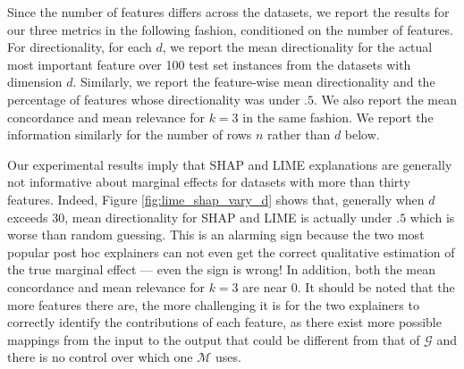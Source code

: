 \documentclass[mnsc,blindrev]{informs3}
\newcommand{\mG}{\mathcal{G}}
\newcommand{\mM}{\mathcal{M}}
\begin{document}
        Since the number of features differs across the datasets, we report the results for our three metrics in the following fashion, conditioned on the number of features. For directionality, for each $d$, we report the mean directionality for the actual most important feature over 100 test set instances from the datasets with dimension $d$. Similarly, we report the feature-wise mean directionality and the percentage of features whose directionality was under $.5$. We also report the mean concordance and mean relevance for $k=3$ in the same fashion. We report the information similarly for the number of rows $n$ rather than $d$ below.   

    
    Our experimental results imply that SHAP and LIME explanations are generally not informative about marginal effects for datasets with more than thirty features. Indeed, Figure \ref{fig:lime_shap_vary_d} shows that, generally when $d$ exceeds $30$, mean directionality for SHAP and LIME is actually under $.5$ which is worse than random guessing. This is an alarming sign because the two most popular post hoc explainers can not even get the correct qualitative estimation of the true marginal effect --- even the sign is wrong! In addition, both the mean concordance and mean relevance for $k=3$ are near $0$. It should be noted that the more features there are, the more challenging it is for the two explainers to correctly identify the contributions of each feature, as there exist more possible mappings from the input to the output that could be different from that of $\mG$ and there is no control over which one $\mM$ uses.
\end{document}
